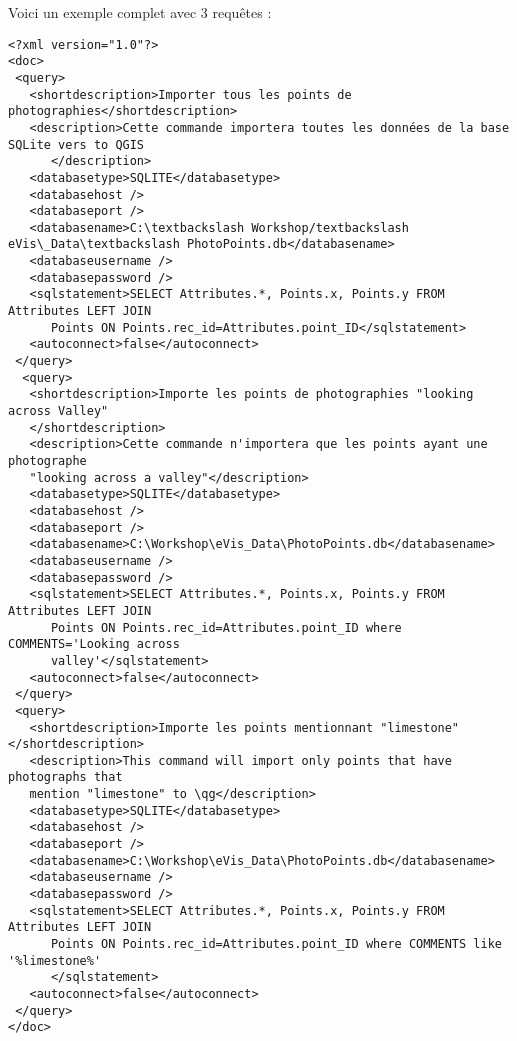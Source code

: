 Voici un exemple complet avec 3 requêtes :
{\small
\begin{verbatim}
<?xml version="1.0"?>
<doc>
 <query>
   <shortdescription>Importer tous les points de photographies</shortdescription>
   <description>Cette commande importera toutes les données de la base SQLite vers to QGIS
      </description>
   <databasetype>SQLITE</databasetype>
   <databasehost />
   <databaseport />
   <databasename>C:\textbackslash Workshop/textbackslash
eVis\_Data\textbackslash PhotoPoints.db</databasename>
   <databaseusername />
   <databasepassword />
   <sqlstatement>SELECT Attributes.*, Points.x, Points.y FROM Attributes LEFT JOIN 
      Points ON Points.rec_id=Attributes.point_ID</sqlstatement>
   <autoconnect>false</autoconnect>
 </query>
  <query>
   <shortdescription>Importe les points de photographies "looking across Valley"
   </shortdescription>
   <description>Cette commande n'importera que les points ayant une photographe 
   "looking across a valley"</description>
   <databasetype>SQLITE</databasetype>
   <databasehost />
   <databaseport />
   <databasename>C:\Workshop\eVis_Data\PhotoPoints.db</databasename>
   <databaseusername />
   <databasepassword />
   <sqlstatement>SELECT Attributes.*, Points.x, Points.y FROM Attributes LEFT JOIN 
      Points ON Points.rec_id=Attributes.point_ID where COMMENTS='Looking across 
      valley'</sqlstatement>
   <autoconnect>false</autoconnect>
 </query>
 <query>
   <shortdescription>Importe les points mentionnant "limestone"</shortdescription>
   <description>This command will import only points that have photographs that
   mention "limestone" to \qg</description>
   <databasetype>SQLITE</databasetype>
   <databasehost />
   <databaseport />
   <databasename>C:\Workshop\eVis_Data\PhotoPoints.db</databasename>
   <databaseusername />
   <databasepassword />
   <sqlstatement>SELECT Attributes.*, Points.x, Points.y FROM Attributes LEFT JOIN 
      Points ON Points.rec_id=Attributes.point_ID where COMMENTS like '%limestone%'
      </sqlstatement>
   <autoconnect>false</autoconnect>
 </query>
</doc>
\end{verbatim}}

